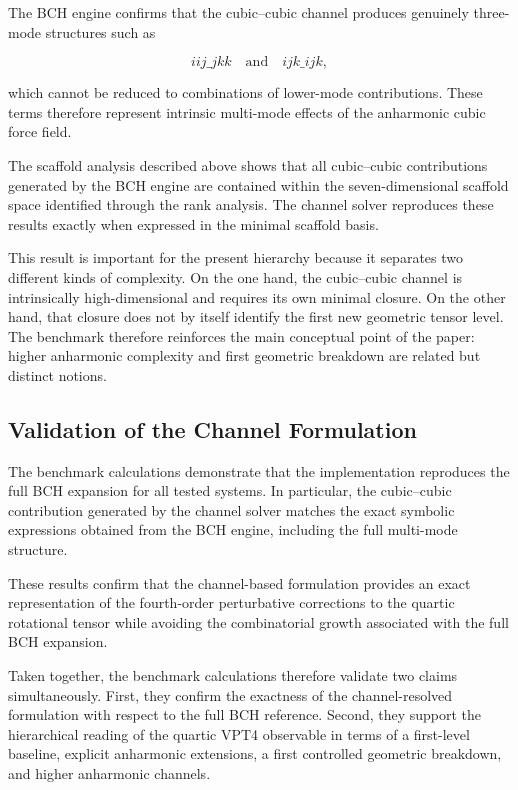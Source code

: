 \documentclass[aip,jcp,reprint]{revtex4-2}
\begin{document}
The BCH engine confirms that the cubic--cubic channel produces
genuinely three-mode structures such as

\begin{equation}
iij\_jkk
\quad\text{and}\quad
ijk\_ijk,
\end{equation}

which cannot be reduced to combinations of lower-mode contributions.
These terms therefore represent intrinsic multi-mode effects of the
anharmonic cubic force field.

The scaffold analysis described above
shows that all cubic--cubic contributions generated by the BCH engine
are contained within the seven-dimensional scaffold space identified
through the rank analysis.
The channel solver reproduces these results exactly when expressed in
the minimal scaffold basis.

This result is important for the present hierarchy because it separates
two different kinds of complexity. On the one hand, the cubic--cubic
channel is intrinsically high-dimensional and requires its own minimal
closure. On the other hand, that closure does not by itself identify the
first new geometric tensor level. The benchmark therefore reinforces the
main conceptual point of the paper: higher anharmonic complexity and
first geometric breakdown are related but distinct notions.

\subsection{Validation of the Channel Formulation}

The benchmark calculations demonstrate that the
implementation reproduces the full BCH expansion for all tested
systems.
In particular, the cubic--cubic contribution generated by the channel
solver matches the exact symbolic expressions obtained from the BCH
engine, including the full multi-mode structure.

These results confirm that the channel-based formulation provides an
exact representation of the fourth-order perturbative corrections to
the quartic rotational tensor while avoiding the combinatorial growth
associated with the full BCH expansion.

Taken together, the benchmark calculations therefore validate two
claims simultaneously. First, they confirm the exactness of the
channel-resolved formulation with respect to the full BCH reference.
Second, they support the hierarchical reading of the quartic VPT4
observable in terms of a first-level baseline, explicit anharmonic
extensions, a first controlled geometric breakdown, and higher
anharmonic channels.
\end{document}
